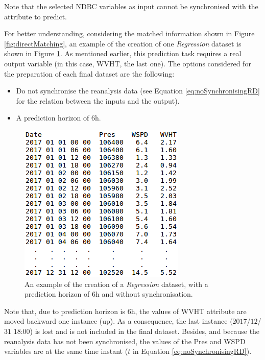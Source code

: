 \documentclass[energies,article,submit,moreauthors,pdftex]{Definitions/mdpi}
\begin{document}
\begin{itemize}[leftmargin=*,labelsep=5.8mm]
						Note that the selected NDBC variables as input cannot be synchronised with the attribute to predict.
						
 						For better understanding, considering the matched information shown in Figure \ref{fig:directMatching}, an example of the creation of one \textit{Regression} dataset is shown in Figure \ref{fig:regressionNoSync}. As mentioned earlier, this prediction task requires a real output variable (in this case, WVHT, the last one). The options considered for the preparation of each final dataset are the following:
 							\begin{itemize}[leftmargin=*,labelsep=5.8mm]
 								\item Do not synchronise the reanalysis data (see Equation \ref{eq:noSynchronisingRD} for the relation between the inputs and the output).
 								\item A prediction horizon of $6$h.
 							\end{itemize}
 							 							
							\begin{figure}[H]
								\centering
								\includegraphics[scale=0.49]{figures/FigureRegressionNoSync.png}
								\caption{An example of the creation of a \textit{Regression} dataset, with a prediction horizon of $6$h and without synchronisation.}
								\label{fig:regressionNoSync}
							\end{figure}
 						
 						Note that, due to prediction horizon is $6$h, the values of WVHT attribute are moved backward one instance (up). As a consequence, the last instance ($2017$/$12$/$31$ $18$:$00$) is lost and is not included in the final dataset. Besides, and because the reanalysis data has not been synchronised, the values of the Pres and WSPD variables are at the same time instant ($t$ in Equation \ref{eq:noSynchronisingRD}).
						

\end{itemize}
\end{document}

